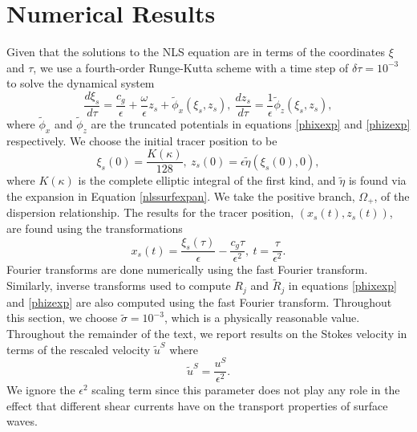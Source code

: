 \documentclass[a4paper,11pt]{article}
\begin{document}
\section{Numerical Results}
Given that the solutions to the NLS equation are in terms of the coordinates $\xi$ and $\tau$, we use a fourth-order Runge-Kutta scheme with a time step of $\delta \tau = 10^{-3}$ to solve the dynamical system
\[
\frac{d \xi_{s}}{d\tau} =  \frac{c_{g}}{\epsilon} + \frac{\omega}{\epsilon}z_{s} + \tilde{\phi}_{x}(\xi_{s},z_{s}), ~ \frac{dz_{s}}{d\tau} = \frac{1}{\epsilon} \tilde{\phi}_{z}(\xi_{s},z_{s}),
\]
where $\tilde{\phi}_{x}$ and $\tilde{\phi}_{z}$ are the truncated potentials in equations \eqref{phixexp} and \eqref{phizexp} respectively.  We choose the initial tracer position to be 
\[
\xi_{s}(0) = \frac{K(\kappa)}{128}, ~ z_{s}(0) = \epsilon \tilde{\eta}(\xi_{s}(0),0),
\]
where $K(\kappa)$ is the complete elliptic integral of the first kind, and $\tilde{\eta}$ is found via the expansion in Equation \eqref{nlssurfexpan}.  We take the positive branch, $\Omega_{+}$, of the dispersion relationship.  The results for the tracer position, $(x_{s}(t),z_{s}(t))$, are found using the transformations 
\[
x_{s}(t) = \frac{\xi_{s}(\tau)}{\epsilon}-\frac{c_{g}\tau}{\epsilon^{2}}, ~ t = \frac{\tau}{\epsilon^{2}}.
\]
Fourier transforms are done numerically using the fast Fourier transform.  Similarly, inverse transforms used to compute $R_{j}$ and $\tilde{R}_{j}$ in equations \eqref{phixexp} and \eqref{phizexp} are also computed using the fast Fourier transform.  Throughout this section, we choose $\tilde{\sigma} = 10^{-3}$, which is a physically reasonable value.  Throughout the remainder of the text, we report results on the Stokes velocity in terms of the rescaled velocity $\tilde{u}^{S}$ where 
\[
\tilde{u}^{S} = \frac{u^{S}}{\epsilon^{2}}.
\]
We ignore the $\epsilon^{2}$ scaling term since this parameter does not play any role in the effect that different shear currents have on the transport properties of surface waves. 
\end{document}
